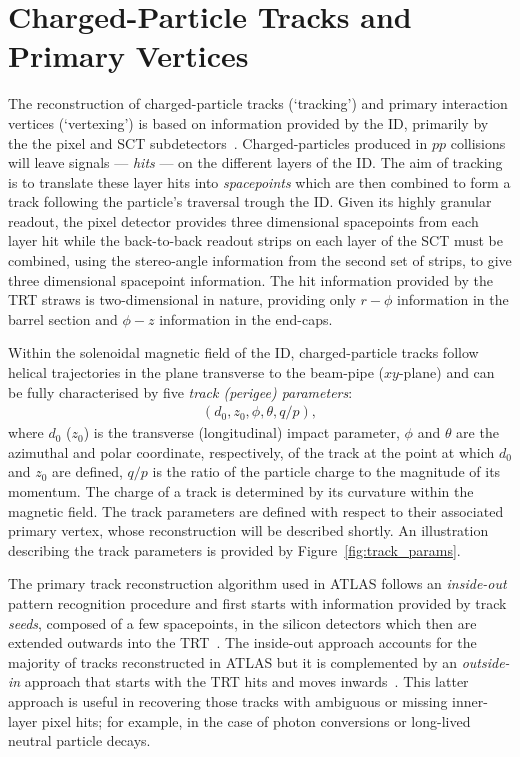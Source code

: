 \section{Charged-Particle Tracks and Primary Vertices}
\label{sec:tracks_and_vertices}

The reconstruction of charged-particle tracks (`tracking') and primary interaction
vertices (`vertexing') is based on information provided by the ID, primarily by the
the pixel and SCT subdetectors~\cite{NEWTracking,TIDE,Aaboud:2016rmg,ATLAS-CONF-2010-069,Piacquadio_2008}.
Charged-particles produced in $pp$ collisions will leave signals --- \textit{hits} ---
on the different layers of the ID.
The aim of tracking is to translate these layer hits into \textit{spacepoints}
which are then combined to form a track following the particle's traversal trough the ID.
Given its highly granular readout, the pixel detector provides three dimensional spacepoints
from each layer hit while the back-to-back readout strips on each layer of the SCT 
must be combined, using the stereo-angle information from the second set of strips, to
give three dimensional spacepoint information.
The hit information provided by the TRT straws is two-dimensional in nature, providing only
$r-\phi$ information in the barrel section and $\phi-z$ information in the end-caps.

Within the solenoidal magnetic field of the ID, charged-particle tracks follow
helical trajectories in the plane transverse to the beam-pipe ($xy$-plane) and
can be fully characterised by five \textit{track (perigee) parameters}:
\begin{align}
    \left(d_0, z_0, \phi, \theta, q/p\right),
    \label{eq:track_parameters}
\end{align}
where $d_0$ ($z_0$) is the transverse (longitudinal) impact parameter,
$\phi$ and $\theta$ are the azimuthal and polar coordinate, respectively, of the track at the
point at which $d_0$ and $z_0$ are defined, $q/p$ is the ratio of the particle charge
to the magnitude of its momentum.
The charge of a track is determined by its curvature within the magnetic field.
The track parameters are defined with respect to their associated primary
vertex, whose reconstruction will be described shortly.
An illustration describing the track parameters is provided by Figure~\ref{fig:track_params}.

The primary track reconstruction algorithm used in ATLAS follows an \textit{inside-out} pattern
recognition procedure and first starts with information
provided by track \textit{seeds}, composed of a few spacepoints, in the silicon detectors
which then are extended outwards into the TRT~\cite{NEWTracking}.
The inside-out approach accounts for the majority of tracks reconstructed in ATLAS but
it is complemented by an \textit{outside-in} approach that starts with the TRT hits and moves
inwards~\cite{NEWTracking}.
This latter approach is useful in recovering those tracks with ambiguous or missing inner-layer pixel hits;
for example, in the case of photon
conversions or long-lived neutral particle decays.

